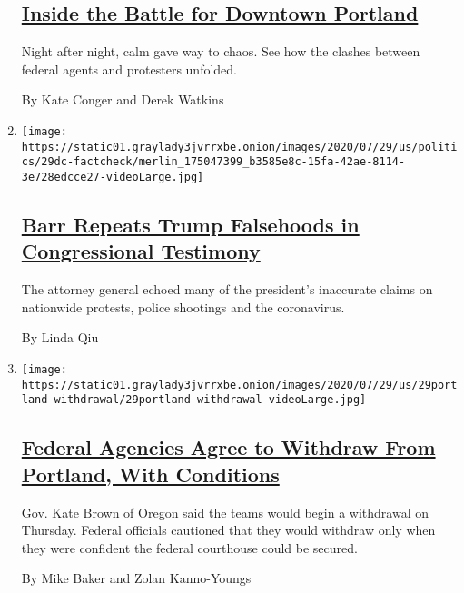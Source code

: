 \begin{enumerate}
  \hypertarget{inside-the-battle-for-downtown-portland}{%
  \subsection{\texorpdfstring{\href{/interactive/2020/07/31/us/portland-protests-map-photos.html}{Inside
  the Battle for Downtown
  Portland}}{Inside the Battle for Downtown Portland}}\label{inside-the-battle-for-downtown-portland}}

  Night after night, calm gave way to chaos. See how the clashes between
  federal agents and protesters unfolded.

  By Kate Conger and Derek Watkins
\item
  \texttt{[image: https://static01.graylady3jvrrxbe.onion/images/2020/07/29/us/politics/29dc-factcheck/merlin\_175047399\_b3585e8c-15fa-42ae-8114-3e728edcce27-videoLarge.jpg]}

  \hypertarget{barr-repeats-trump-falsehoods-in-congressional-testimony}{%
  \subsection{\texorpdfstring{\href{/2020/07/29/us/politics/barr-trump-factcheck-congressional-testimony.html}{Barr
  Repeats Trump Falsehoods in Congressional
  Testimony}}{Barr Repeats Trump Falsehoods in Congressional Testimony}}\label{barr-repeats-trump-falsehoods-in-congressional-testimony}}

  The attorney general echoed many of the president's inaccurate claims
  on nationwide protests, police shootings and the coronavirus.

  By Linda Qiu
\item
  \texttt{[image: https://static01.graylady3jvrrxbe.onion/images/2020/07/29/us/29portland-withdrawal/29portland-withdrawal-videoLarge.jpg]}

  \hypertarget{federal-agencies-agree-to-withdraw-from-portland-with-conditions}{%
  \subsection{\texorpdfstring{\href{/2020/07/29/us/protests-portland-federal-withdrawal.html}{Federal
  Agencies Agree to Withdraw From Portland, With
  Conditions}}{Federal Agencies Agree to Withdraw From Portland, With Conditions}}\label{federal-agencies-agree-to-withdraw-from-portland-with-conditions}}

  Gov. Kate Brown of Oregon said the teams would begin a withdrawal on
  Thursday. Federal officials cautioned that they would withdraw only
  when they were confident the federal courthouse could be secured.

  By Mike Baker and Zolan Kanno-Youngs
\end{enumerate}

